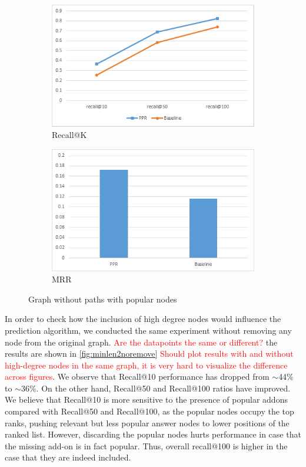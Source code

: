 \documentclass[11pt,oneside]{book}
\begin{document}
\begin{figure}[t]
\centering
\begin{subfigure}[b]{0.49\textwidth}
	\centering
\includegraphics[scale=0.49]{figures/minlen2noremove.png}
\caption{Recall@K}
\label{fig:minlen2noremoveRecall}
\end{subfigure}
\begin{subfigure}[b]{0.49\textwidth}
	\centering
\includegraphics[scale=0.49]{figures/minlen2noremoveMRR.png}
\caption{MRR}
\label{fig:minlen2noremoveMRR}
\end{subfigure}
\caption{Graph without paths with popular nodes}
	\label{fig:minlen2noremove}
\end{figure}

In order to check how the inclusion of high degree nodes would influence
the prediction algorithm, we conducted the same experiment without removing any node
from the original graph. \textcolor{red}{Are the datapoints the same or different?} the results are shown in
\autoref{fig:minlen2noremove} \textcolor{red}{Should plot results with and  without high-degree nodes in the same graph, it is very hard to visualize the difference across figures}. We observe that Recall@10 performance has
dropped from {$\sim$}44\% to {$\sim$}36\%. On the other hand, Recall@50 and
Recall@100 ratios have improved. We believe that Recall@10 is more sensitive to the presence of popular addons compared with Recall@50 and
Recall@100, as the popular nodes occupy the top ranks, pushing relevant but less popular answer nodes to lower positions of the ranked list. However, discarding the popular nodes hurts performance in case that the missing add-on is in fact popular. Thus, overall recall@100 is higher in the case that they are indeed included. 
\end{document}
